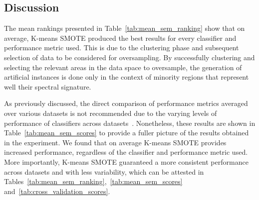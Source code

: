 \documentclass[information,article,submit,moreauthors,pdftex]{Definitions/mdpi}
\begin{document}
\begin{table}[H]
    \caption{
        \textit{p-values} of the Wilcoxon signed-rank test. Boldface values
        are statistically significant at a significance level of $\alpha =
        0.05$.
    \vspace{-.6cm}}\label{tab:wilcoxon_test}
\end{table}
\begin{paracol}{2}
\linenumbers
\switchcolumn

\subsection{Discussion}

The mean rankings presented in Table~\ref{tab:mean_sem_ranking} show that on
average, K-means SMOTE produced the best results for every classifier and
performance metric used. This is due to the clustering phase and subsequent
selection of data to be considered for oversampling. By successfully
clustering and selecting the relevant areas in the data space to oversample,
the generation of artificial instances is done only in the context of minority
regions that represent well their spectral signature.

As previously discussed, the direct comparison of performance metrics averaged
over various datasets is not recommended due to the varying levels of
performance of classifiers across datasets~\citep{demvsar2006}. Nonetheless,
these results are shown in Table~\ref{tab:mean_sem_scores} to provide a fuller
picture of the results obtained in the experiment. We found that on average
K-means SMOTE provides increased performance, regardless of the classifier and
performance metric used. More importantly, K-means SMOTE guaranteed a more
consistent performance across datasets and with less variability, which can be
attested in Tables~\ref{tab:mean_sem_ranking},~\ref{tab:mean_sem_scores}
and~\ref{tab:cross_validation_scores}. 


\end{paracol}
\end{document}
